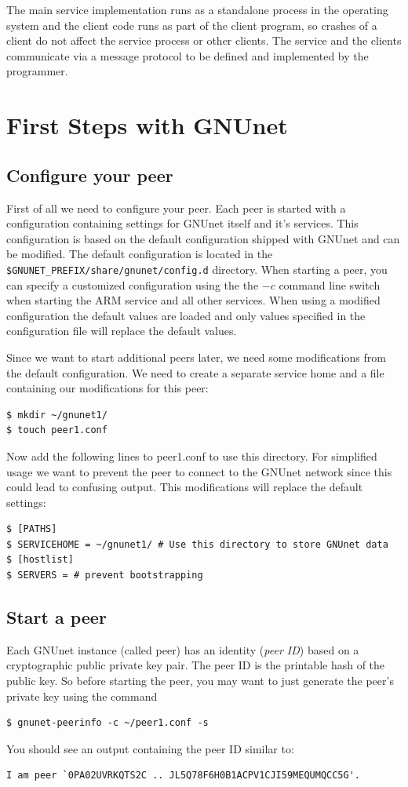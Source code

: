 \documentclass[10pt]{article}
\begin{document}
The main service implementation runs as a standalone process in the operating
system and the client code runs as part of the client program, so crashes of a
client do not affect the service process or other clients. The service and the
clients communicate via a message protocol to be defined and implemented by
the programmer.

\section{First Steps with GNUnet}

\subsection{Configure your peer}
First of all we need to configure your peer. Each peer is started with a configuration containing settings for GNUnet itself and it's services. This configuration is based on the default configuration shipped with GNUnet and can be modified. The default configuration is located in the {\tt \$GNUNET\_PREFIX/share/gnunet/config.d} directory. When starting a peer, you can specify a customized configuration using the the {\tt$-c$} command line switch when starting the ARM service and all other services. When using a modified configuration the default values are loaded and only values specified in the configuration file will replace the default values.

Since we want to start additional peers later, we need 
some modifications from the default configuration. We need to create a separate service home and a file containing our modifications for this peer:
\begin{lstlisting}
$ mkdir ~/gnunet1/
$ touch peer1.conf
\end{lstlisting}

Now add the following lines to peer1.conf to use this directory. For simplified usage we want to prevent 
the peer to connect to the GNUnet network since this could lead to confusing output. This modifications will replace the default settings:
\begin{lstlisting}
$ [PATHS]
$ SERVICEHOME = ~/gnunet1/ # Use this directory to store GNUnet data
$ [hostlist]
$ SERVERS = # prevent bootstrapping
\end{lstlisting}

\subsection{Start a peer}
Each GNUnet instance (called peer) has an identity (\textit{peer ID}) based on a 
cryptographic public private key pair. The peer ID is the printable hash of the 
public key. So before starting the peer, you may want to just generate the peer's private 
key using the command
\lstset{language=bash}
\begin{lstlisting}
$ gnunet-peerinfo -c ~/peer1.conf -s
\end{lstlisting}
You should see an output containing the peer ID similar to:
\lstset{language=bash}
\begin{lstlisting}
I am peer `0PA02UVRKQTS2C .. JL5Q78F6H0B1ACPV1CJI59MEQUMQCC5G'.
\end{lstlisting}
\end{document}
